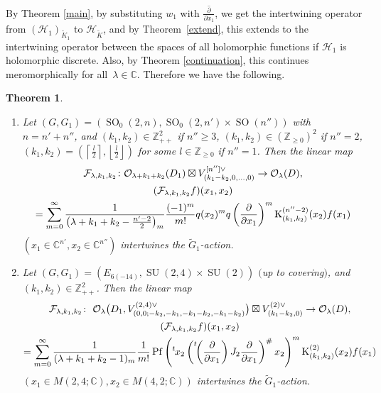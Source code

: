 \documentclass[pdftex]{sigma}
\numberwithin{equation}{section}
\newtheorem{Theorem}{Theorem}[section]
\newcommand{\BZ}{\mathbb{Z}}
\newcommand{\BC}{\mathbb{C}}
\newcommand{\cF}{\mathcal{F}}
\newcommand{\cH}{\mathcal{H}}
\newcommand{\cO}{\mathcal{O}}
\newcommand{\rK}{\mathrm{K}}
\newcommand{\Pf}{\operatorname{Pf}}
\begin{document}
By Theorem \ref{main}, by substituting $w_1$ with $\overline{\frac{\partial}{\partial x_1}}$, we get the intertwining operator from $(\cH_1)_{\tilde{K}_1}$ to $\cH_{\tilde{K}}$, and by Theorem~\ref{extend}, this extends to the intertwining operator between the spaces of all holomorphic functions if $\cH_1$ is holomorphic discrete. Also, by Theorem \ref{continuation}, this continues meromorphically for all~$\lambda\in\BC$. Therefore we have the following.
\begin{Theorem}\label{main5}\quad
\begin{enumerate}\itemsep=0pt
\item[$(1)$] Let $(G,G_1)=(\operatorname{SO}_0(2,n), \operatorname{SO}_0(2,n')\times \operatorname{SO}(n''))$ with $n=n'+n''$, and $(k_1,k_2)\in\BZ_{++}^2$ if $n''\ge 3$,
$(k_1,k_2)\in(\BZ_{\ge 0})^2$ if $n''=2$, $(k_1,k_2)=\left(\left\lceil\frac{l}{2}\right\rceil,\left\lfloor\frac{l}{2}\right\rfloor\right)$
for some $l\in\BZ_{\ge 0}$ if $n''=1$. Then the linear map
\begin{gather}
\cF_{\lambda,k_1,k_2}\colon \cO_{\lambda+k_1+k_2}(D_1)\boxtimes V_{(k_1-k_2,0,\ldots,0)}^{[n'']\vee}
\to \cO_\lambda(D), \notag \\
 (\cF_{\lambda,k_1,k_2}f)(x_1,x_2)\notag \\ =\sum_{m=0}^{\infty}
\frac{1}{\left(\lambda+k_1+k_2-\frac{n'-2}{2}\right)_m}\frac{(-1)^m}{m!}q(x_2)^m
q\left(\frac{\partial}{\partial x_1}\right)^m\rK_{(k_1,k_2)}^{(n''-2)}(x_2)f(x_1)\label{SO-SOSO}
\end{gather}
$(x_1\in\BC^{n'}, x_2\in\BC^{n''})$ intertwines the $\tilde{G}_1$-action.
\item[$(2)$] Let $(G,G_1)=(E_{6(-14)}, \operatorname{SU}(2,4)\times \operatorname{SU}(2))$ $($up to covering$)$, and $(k_1,k_2)\in\BZ_{++}^2$.
Then the linear map
\begin{gather*}
\cF_{\lambda,k_1,k_2}\colon \ \cO_{\lambda}\big(D_1,V_{(0,0;-k_2,-k_1,-k_1-k_2,-k_1-k_2)}^{(2,4)\vee}\big)
\boxtimes V_{(k_1-k_2,0)}^{(2)\vee}\to \cO_\lambda(D), \\
 (\cF_{\lambda,k_1,k_2}f)(x_1,x_2)\\
=\sum_{m=0}^\infty \frac{1}{(\lambda+k_1+k_2-1)_m}\frac{1}{m!}
\Pf\left({}^t\hspace{-1pt}x_2\left({\vphantom{\Bigl(}}^t\!\!\left(\frac{\partial}{\partial x_1}\right)J_2\frac{\partial}{\partial x_1}
\right)^\#x_2\right)^m\rK_{(k_1,k_2)}^{(2)}(x_2)f(x_1)
\end{gather*}
$(x_1\in M(2,4;\BC),x_2\in M(4,2;\BC))$ intertwines the $\tilde{G}_1$-action.

\end{enumerate}
\end{Theorem}
\end{document}
